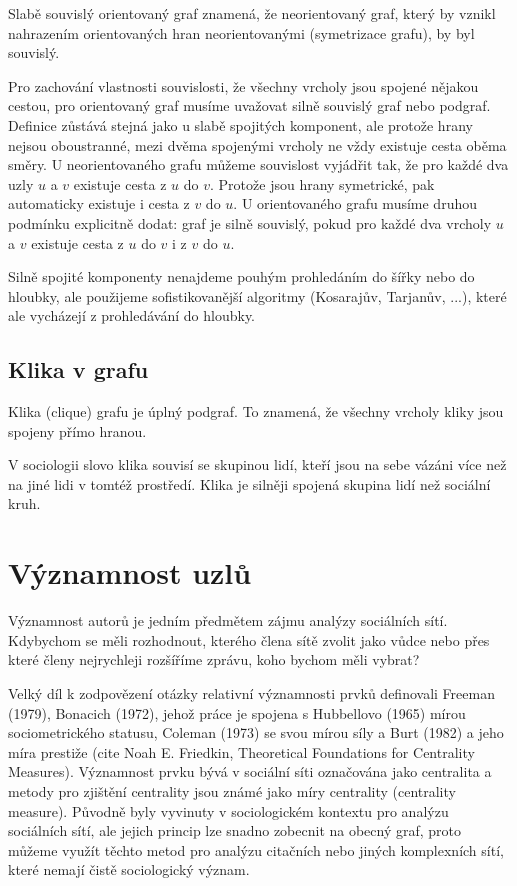\documentclass[12pt,titlepage]{report}
\begin{document}
Slabě souvislý orientovaný graf znamená, že neorientovaný graf, který by vznikl
nahrazením orientovaných hran neorientovanými (symetrizace grafu), by byl
souvislý.

Pro zachování vlastnosti souvislosti, že všechny vrcholy jsou spojené nějakou
cestou, pro orientovaný graf musíme uvažovat silně souvislý graf nebo podgraf.
Definice zůstává stejná jako u slabě spojitých komponent, ale protože hrany
nejsou oboustranné, mezi dvěma spojenými vrcholy ne vždy existuje cesta oběma
směry. U neorientovaného grafu můžeme souvislost vyjádřit tak, že pro každé dva
uzly $u$ a $v$ existuje cesta z $u$ do $v$. Protože jsou hrany symetrické, pak
automaticky existuje i cesta z $v$ do $u$. U orientovaného grafu musíme druhou
podmínku explicitně dodat: graf je silně souvislý, pokud pro každé dva vrcholy
$u$ a $v$ existuje cesta z $u$ do $v$ i z $v$ do $u$. 

Silně spojité komponenty nenajdeme pouhým prohledáním do šířky nebo do hloubky,
ale použijeme sofistikovanější algoritmy (Kosarajův, Tarjanův, ...), které ale
vycházejí z prohledávání do hloubky.

\subsection{Klika v grafu}
Klika (clique) grafu je úplný podgraf. To znamená, že všechny vrcholy kliky
jsou spojeny přímo hranou.

V sociologii slovo klika souvisí se skupinou lidí, kteří jsou na sebe vázáni
více než na jiné lidi v tomtéž prostředí. Klika je silněji spojená skupina lidí
než sociální kruh.

\section{Významnost uzlů}
Významnost autorů je jedním předmětem zájmu analýzy sociálních sítí. Kdybychom
se měli rozhodnout, kterého člena sítě zvolit jako vůdce nebo přes které členy
nejrychleji rozšíříme zprávu, koho bychom měli vybrat? 

Velký díl k zodpovězení otázky relativní významnosti prvků definovali Freeman
(1979), Bonacich (1972), jehož práce je spojena s Hubbellovo (1965) mírou
sociometrického statusu, Coleman (1973) se svou mírou síly a Burt (1982) a jeho
míra prestiže (cite Noah E. Friedkin, Theoretical Foundations for Centrality Measures). Významnost prvku bývá v sociální síti označována jako centralita
a metody pro zjištění centrality jsou známé jako míry centrality (centrality
measure). Původně byly vyvinuty v sociologickém kontextu pro analýzu sociálních
sítí, ale jejich princip lze snadno zobecnit na obecný graf, proto můžeme
využít těchto metod pro analýzu citačních nebo jiných komplexních sítí, které
nemají čistě sociologický význam.
\end{document}
